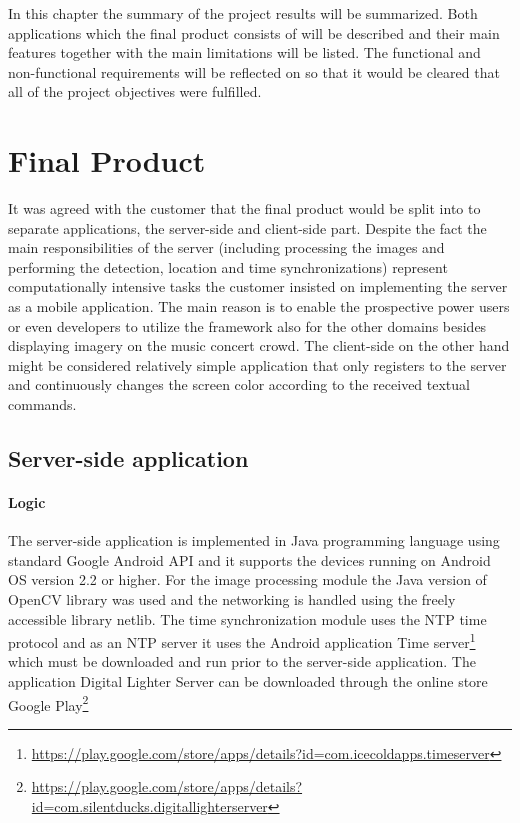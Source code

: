 In this chapter the summary of the project results will be summarized. Both applications which the final product consists of will be described and their main features together with the main limitations will be listed.  The functional and non-functional requirements will be reflected on so that it would be cleared that all of the project objectives were fulfilled. 

\section{Final Product}
It was agreed with the customer that the final product would be split into to separate applications, the server-side and client-side part. Despite the fact the main responsibilities of the server (including processing the images and performing the detection, location and time synchronizations) represent computationally intensive tasks the customer insisted on implementing the server as a mobile application. The main reason is to enable the prospective power users or even developers to utilize the framework also for the other domains besides displaying imagery on the music concert crowd. The client-side on the other hand might be considered relatively simple application that only registers to the server and continuously changes the screen color according to the received textual commands.

\subsection{Server-side application}

\paragraph{Logic}
The server-side application is implemented in Java programming language using standard Google Android API and it supports the devices running on Android OS version 2.2 or higher. For the image processing module the Java version of OpenCV library was used and the networking is handled using the freely accessible library netlib. The time synchronization module uses the NTP time protocol and as an NTP server it uses the Android application Time server\footnote{\url{https://play.google.com/store/apps/details?id=com.icecoldapps.timeserver}} which must be downloaded and run prior to the server-side application. The application Digital Lighter Server can be downloaded through the online store Google Play\footnote{\url{https://play.google.com/store/apps/details?id=com.silentducks.digitallighterserver}}

